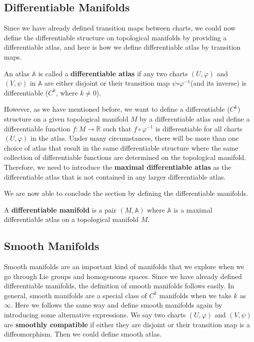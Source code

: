 \documentclass[12pt,twoside]{article}
\begin{document}
\subsection{Differentiable Manifolds}
Since we have already defined transition maps between charts, we could now define the differentiable structure on topological manifolds by providing a differentiable atlas, and here is how we define differentiable atlas by transition maps.
\begin{definition}
An atlas $\mathbb{A}$ is called a {\bf differentiable atlas} if any two charts $(U,\varphi)$ and $(V,\psi)$ in $\mathbb{A}$ are either disjoint or their transition map $\psi$$\circ$$\varphi ^ {-1}$(and its inverse) is differentiable ($C^{k}$, where $k\neq 0$). \\
\end{definition}
However, as we have mentioned before, we want to define a differentiable ($C^{k}$) structure on a given topological manifold $M$ by a differentiable atlas and define a differentiable function $f:M\rightarrow \mathbb{R}$ such that $f\circ \varphi^{-1}$ is differentiable for all charts $(U,\varphi)$ in the atlas. Under many circumstances, there will be more than one choice of atlas that result in the same differentiable structure where the same collection of differentiable functions are determined on the topological manifold. Therefore, we need to introduce the {\bf maximal differentiable atlas} as the differentiable atlas that is not contained in any larger differentiable atlas.

We are now able to conclude the section by defining the differentiable manifolds.
\begin{definition}
A {\bf differentiable manifold} is a pair $(M,\mathbb{A})$ where $\mathbb{A}$ is a maximal differentiable atlas on a topological manifold $M$.
\end{definition}
\subsection{Smooth Manifolds}
Smooth manifolds are an important kind of manifolds that we explore when we go through Lie groups and homogeneous spaces. Since we have already defined differentiable manifolds, the definition of smooth manifolds follows easily. In general, smooth manifolds are a special class of $C^{k}$ manifolds when we take $k$ as $\infty$. Here we follows the same way and define smooth manifolds again by introducing some alternative expressions. We say two charts $(U,\varphi)$ and $(V,\psi)$ are {\bf smoothly compatible} if either they are disjoint or their transition map is a diffeomorphism. Then we could define smooth atlas.
\end{document}
